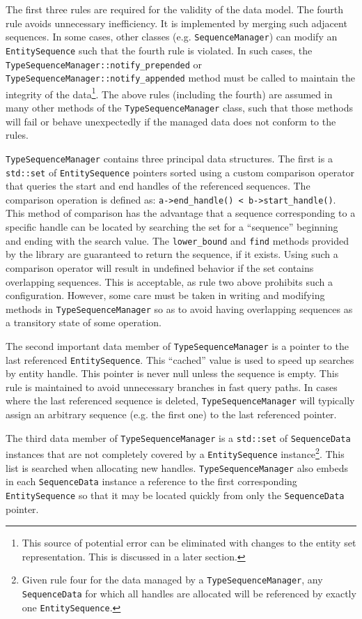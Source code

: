 \documentclass{report}
\begin{document}
The first three rules are required for the validity of the data model.  The fourth rule avoids unnecessary inefficiency.  It is implemented by merging such adjacent sequences.  In some cases, other classes (e.g. \texttt{SequenceManager}) can modify an \texttt{EntitySequence} such that the fourth rule is violated.  In such cases, the \texttt{TypeSequenceManager::notify\_prepended} or \texttt{TypeSequenceManager::notify\_appended} method must be called to maintain the integrity of the data\footnote{This source of potential error can be eliminated with changes to the entity set representation.  This is discussed in a later section.}.  The above rules (including the fourth) are assumed in many other methods of the \texttt{TypeSequenceManager} class, such that those methods will fail or behave unexpectedly if the managed data does not conform to the rules.

\texttt{TypeSequenceManager} contains three principal data structures.  The first is a \texttt{std::set} of \texttt{EntitySequence} pointers sorted using a custom comparison operator that queries the start and end handles of the referenced sequences.  The comparison operation is defined as: \verb|a->end_handle() < b->start_handle()|. This method of comparison has the advantage that a sequence corresponding to a specific handle can be located by searching the set for a ``sequence'' beginning and ending with the search value.  The \texttt{lower\_bound} and \texttt{find} methods provided by the library are guaranteed to return the sequence, if it exists.  Using such a comparison operator will result in undefined behavior if the set contains overlapping sequences.  This is acceptable, as rule two above prohibits such a configuration.  However, some care must be taken in writing and modifying methods in \texttt{TypeSequenceManager} so as to avoid having overlapping sequences as a transitory state of some operation.

The second important data member of \texttt{TypeSequenceManager} is a pointer to the last referenced \texttt{EntitySequence}.  This ``cached'' value is used to speed up searches by entity handle.  This pointer is never null unless the sequence is empty.  This rule is maintained to avoid unnecessary branches in fast query paths.  In cases where the last referenced sequence is deleted, \texttt{TypeSequenceManager} will typically assign an arbitrary sequence (e.g. the first one) to the last referenced pointer.

The third data member of \texttt{TypeSequenceManager} is a \texttt{std::set} of \texttt{SequenceData} instances that are not completely covered by a \texttt{EntitySequence} instance\footnote{Given rule four for the data managed by a \texttt{TypeSequenceManager}, any \texttt{SequenceData} for which all handles are allocated will be referenced by exactly one \texttt{EntitySequence}.}.  This list is searched when allocating new handles.  \texttt{TypeSequenceManager} also embeds in each \texttt{SequenceData} instance a reference to the first corresponding \texttt{EntitySequence} so that it may be located quickly from only the \texttt{SequenceData} pointer.
\end{document}
